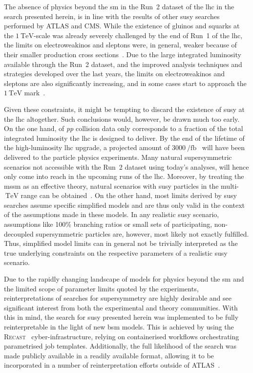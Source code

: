 The absence of physics beyond the \gls{sm} in the Run~2 dataset of the \gls{lhc} in the search presented herein, is in line with the results of other \gls{susy} searches performed by ATLAS and CMS.
While the existence of gluinos and squarks at the $\SI{1}{\TeV}$-scale was already severely challenged by the end of Run~1 of the \gls{lhc}, the limits on electroweakinos and sleptons were, in general, weaker because of their smaller production cross sections~\cite{SUSY-2014-06,SUSY-2014-05}.
Due to the large integrated luminosity available through the Run~2 dataset, and the improved analysis techniques and strategies developed over the last years, the limits on electroweakinos and sleptons are also significantly increasing, and in some cases start to approach the $\SI{1}{\TeV}$ mark~\cite{ATL-PHYS-PUB-2021-007,SUSY-2018-32}. 

Given these constraints, it might be tempting to discard the existence of \gls{susy} at the \gls{lhc} altogether. Such conclusions would, however, be drawn much too early.
On the one hand, \onethirtynineifb of \textit{pp} collision data only corresponds to a fraction of the total integrated luminosity the \gls{lhc} is designed to deliver. By the end of the lifetime of the high-luminosity \gls{lhc} upgrade, a projected amount of $\SI{3000}{\per\femto\barn}$~\cite{Apollinari:2284929} will have been delivered to the particle physics experiments.
Many natural supersymmetric scenarios not accessible with the Run~2 dataset using today's analyses, will hence only come into reach in the upcoming runs of the \gls{lhc}. Moreover, by treating the \gls{mssm} as an effective theory, natural scenarios with \gls{susy} particles in the multi-$\SI{}{\TeV}$ range can be obtained~\cite{Kobakhidze:2018vuy}.
On the other hand, most limits derived by \gls{susy} searches assume specific simplified models and are thus only valid in the context of the assumptions made in these models.
In any realistic \gls{susy} scenario, assumptions like 100\% branching ratios or small sets of participating, non-decoupled supersymmetric particles are, however, most likely not exactly fulfilled.
Thus, simplified model limits can in general not be trivially interpreted as the true underlying constraints on the respective parameters of a realistic \gls{susy} scenario.
 
Due to the rapidly changing landscape of models for physics beyond the \gls{sm} and the limited scope of parameter limits quoted by the experiments, reinterpretations of searches for supersymmetry are highly desirable and see significant interest from both the experimental and theory communities.
With this in mind, the search for \gls{susy} presented herein was implemented to be fully reinterpretable in the light of new \gls{bsm} models.
This is achieved by using the \textsc{Recast}~\cite{RECAST_cranmer} cyber-infrastructure, relying on containerised workflows orchestrating parametrised job templates.
Additionally, the full likelihood of the search was made publicly available in a readily available format, allowing it to be incorporated in a number of reinterpretation efforts outside of ATLAS~\cite{SModelS_pyhf:2020grj,Goodsell:2020ddr}. 
 
